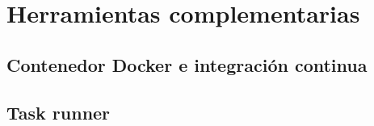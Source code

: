 \chapter{Herramientas complementarias}
\section{Contenedor Docker e integración continua}
\section{Task runner}
